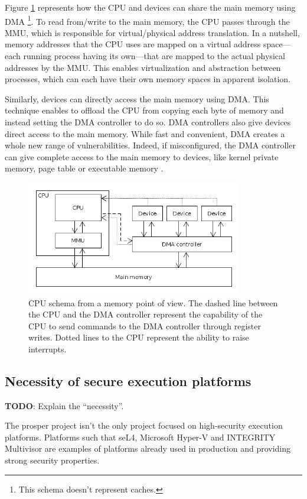 \documentclass{kththesis}
\begin{document}
Figure \ref{cpu-memory-schema} represents how the \gls{CPU} and devices can share the main memory using \gls{DMA} \footnote{This schema doesn't represent caches.}. To read from/write to the main memory, the CPU passes through the \gls{MMU}, which is responsible for virtual/physical address translation. In a nutshell, memory addresses that the CPU uses are mapped on a virtual address space---each running process having its own---that are mapped to the actual physical addresses by the MMU. This enables virtualization and abstraction between processes, which can each have their own memory spaces in apparent isolation.

Similarly, devices can directly access the main memory using DMA. This technique enables to offload the CPU from copying each byte of memory and instead setting the DMA controller to do so. DMA controllers also give devices direct access to the main memory. While fast and convenient, DMA creates a whole new range of vulnerabilities. Indeed, if misconfigured, the DMA controller can give complete access to the main memory to devices, like kernel private memory, page table or executable memory \cite{schwarz_formal_2014}.

\begin{figure}[!t]
	\includegraphics[height=5cm]{figures/cpu-memory-schema.png}
	\centering
	\caption{
CPU schema from a memory point of view. The dashed line between the CPU and the DMA controller represent the capability of the CPU to send commands to the DMA controller through register writes. Dotted lines to the CPU represent the ability to raise interrupts.
}
	\label{cpu-memory-schema}
\end{figure}

\subsection{Necessity of secure execution platforms}

\textbf{TODO}: Explain the ``necessity''.

The \acrshort{prosper} project isn't the only project focused on high-security execution platforms. Platforms such that seL4, Microsoft Hyper-V and INTEGRITY Multivisor are examples of platforms already used in production and providing strong security properties.
\end{document}
